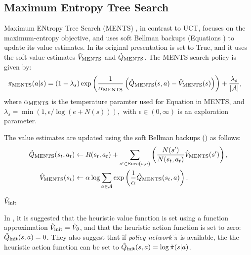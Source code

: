    





    \subsection{Maximum Entropy Tree Search}
    \label{sec:2-4-4-ments}



        Maximum ENtropy Tree Search (MENTS) , in contrast to UCT, focuses on the maximum-entropy objective, and uses soft Bellman backups (Equations ) to update its value estimates. In its original presentation \mctsmode\ewe is set to True, and it uses the soft value estimates ${\hat{V}_{{\textnormal{MENTS}}}}$ and ${\hat{Q}_{{\textnormal{MENTS}}}}$. The MENTS search policy is given by:
        \begin{align}
            {\pi_{{\textnormal{MENTS}}}}(a|s) &= 
                (1-\lambda_s)\exp\left(\frac{1}{\alpha_{{\textnormal{MENTS}}}}\left({\hat{Q}_{{\textnormal{MENTS}}}}(s,a)-{\hat{V}_{{\textnormal{MENTS}}}}(s)\right)\right) 
                    + \frac{\lambda_s}{|\mathcal{A}|},
        \end{align}
        where $\alpha_{{\textnormal{MENTS}}}$ is the temperature paramter used for Equation  in MENTS, and $\lambda_s=\min(1,\epsilon/\log(e+N(s))),$ with $\epsilon \in (0,\infty)$ is an exploration parameter.

        The value estimates are updated using the soft Bellman backups () as follows:
        \begin{align}
            {\hat{Q}_{{\textnormal{MENTS}}}}(s_t,a_t) &\leftarrow 
                R(s_t,a_t) + \sum_{s'\in{\textnormal{Succ}(s,a)}} \left( \frac{N(s')}{N(s_t,a_t)} {\hat{V}_{{\textnormal{MENTS}}}}(s') \right), \\
            {\hat{V}_{{\textnormal{MENTS}}}}(s_t) &\leftarrow 
                \alpha \log \sum_{a\in\mathcal{A}} \exp \left(\frac{1}{\alpha}{\hat{Q}_{{\textnormal{MENTS}}}}(s_t,a) \right).
        \end{align}

        ${\hat{V}_{\textnormal{init}}}$ 

        In , it is suggested that the heuristic value function is set using a function approximation ${\hat{V}_{\textnormal{init}}}=\tilde{V}_\theta$, and that the heuristic action function is set to zero: ${\hat{Q}_{\textnormal{init}}}(s,a)=0$. They also suggest that if \textit{policy network} $\tilde{\pi}$ is available, the the heuristic action function can be set to ${\hat{Q}_{\textnormal{init}}}(s,a)=\log \tilde{\pi}(s|a)$. 

















